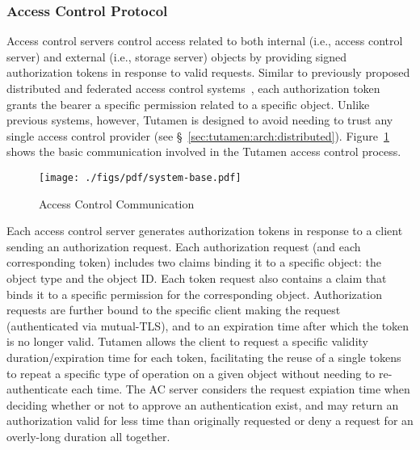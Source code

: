 \subsubsection{Access Control Protocol}
\label{sec:tutamen:arch:acp}

Access control servers control access related to both internal (i.e.,
access control server) and external (i.e., storage server) objects by
providing signed authorization tokens in response to valid
requests. Similar to previously proposed distributed and federated
access control systems~\cite{neuman1994, calero2010, leandro2012},
each authorization token grants the bearer a specific permission
related to a specific object. Unlike previous systems, however,
Tutamen is designed to avoid needing to trust any single access
control provider (see \S~\ref{sec:tutamen:arch:distributed}).
Figure~\ref{fig:tutamen:systembase} shows the basic communication
involved in the Tutamen access control process.

\begin{figure}[th]
  \centering
  \texttt{[image: ./figs/pdf/system-base.pdf]}
  \caption{Access Control Communication}
  \label{fig:tutamen:systembase}
\end{figure}

Each access control server generates authorization tokens in response
to a client sending an authorization request. Each authorization
request (and each corresponding token) includes two claims binding it
to a specific object: the object type and the object ID. Each token
request also contains a claim that binds it to a specific permission
for the corresponding object. Authorization requests are further bound
to the specific client making the request (authenticated via
mutual-TLS), and to an expiration time after which the token is no
longer valid. Tutamen allows the client to request a specific validity
duration/expiration time for each token, facilitating the reuse of a
single tokens to repeat a specific type of operation on a given object
without needing to re-authenticate each time. The AC server considers
the request expiation time when deciding whether or not to approve an
authentication exist, and may return an authorization valid for less
time than originally requested or deny a request for an overly-long
duration all together.

